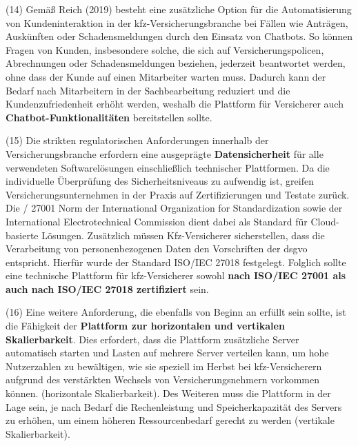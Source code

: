 (14) Gemäß Reich (2019) besteht eine zusätzliche Option für die Automatisierung von Kundeninteraktion in der \ac{kfz}-Versicherungsbranche bei Fällen wie Anträgen, Auskünften oder Schadensmeldungen durch den Einsatz von Chatbots. So können Fragen von Kunden, insbesondere solche, die sich auf Versicherungspolicen, Abrechnungen oder Schadensmeldungen beziehen, jederzeit beantwortet werden, ohne dass der Kunde auf einen Mitarbeiter warten muss. Dadurch kann der Bedarf nach Mitarbeitern in der Sachbearbeitung reduziert und die Kundenzufriedenheit erhöht werden, weshalb die Plattform für Versicherer auch \textbf{Chatbot-Funktionalitäten} bereitstellen sollte. \autocite[Vgl.][S. 300-302]{REICH2019}

(15) Die strikten regulatorischen Anforderungen innerhalb der Versicherungsbranche erfordern eine ausgeprägte \textbf{Datensicherheit} für alle verwendeten Softwarelösungen einschließlich technischer Plattformen. Da die individuelle Überprüfung des Sicherheitsniveaus zu aufwendig ist, greifen Versicherungsunternehmen in der Praxis auf Zertifizierungen und Testate zurück. \autocite[Vgl.][S. 777]{ZDANOWIECKI2016} Die / 27001 Norm der International Organization for Standardization sowie der International Electrotechnical Commission dient dabei als Standard für Cloud-basierte Lösungen. Zusätzlich müssen Kfz-Versicherer sicherstellen, dass die Verarbeitung von personenbezogenen Daten den Vorschriften der \ac{dsgvo} entspricht. Hierfür wurde der Standard ISO/IEC 27018 festgelegt.\autocite[Vgl.][S. 194-196]{HENNRICH2023} Folglich sollte eine technische Plattform für \ac{kfz}-Versicherer sowohl \textbf{nach ISO/IEC 27001 als auch nach ISO/IEC 27018 zertifiziert} sein. 

(16) Eine weitere Anforderung, die ebenfalls von Beginn an erfüllt sein sollte, ist die Fähigkeit der \textbf{Plattform zur horizontalen und vertikalen Skalierbarkeit}. Dies erfordert, dass die Plattform zusätzliche Server automatisch starten und Lasten auf mehrere Server verteilen kann, um hohe Nutzerzahlen zu bewältigen, wie sie speziell im Herbst bei \ac{kfz}-Versicherern aufgrund des verstärkten Wechsels von Versicherungsnehmern vorkommen können. (horizontale Skalierbarkeit). Des Weiteren muss die Plattform in der Lage sein, je nach Bedarf die Rechenleistung und Speicherkapazität des Servers zu erhöhen, um einem höheren Ressourcenbedarf gerecht zu werden (vertikale Skalierbarkeit). \autocite[Vgl.][S. 23]{JAHNERT2020}

\newpage

